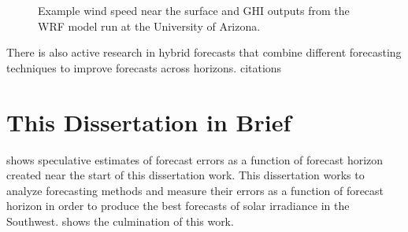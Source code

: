 \begin{figure}[h]
\hspace{-.5em}
\caption[Wind speed and GHI output from UA-WRF]{Example wind speed
  near the surface and GHI outputs from the WRF model run at the
  University of Arizona.}
\label{fig:wrf}
\end{figure}

There is also active research in hybrid forecasts that combine
different forecasting techniques to improve forecasts across horizons.
citations


\section{This Dissertation in Brief}

 shows speculative estimates of
forecast errors as a function of forecast horizon created near the
start of this dissertation work.
This dissertation works to analyze forecasting methods and measure
their errors as a function of forecast horizon in order to
produce the best forecasts of solar irradiance in the Southwest.
 shows the culmination of this work.


